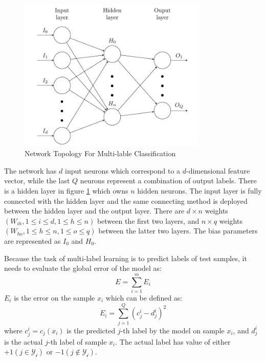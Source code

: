 \graphicspath{ {./Figures/} }
\begin{figure}[!htb]
\centering
\includegraphics[width=0.8\textwidth]{MultiLabelNet.jpeg}
\caption{\label{fig:MultiLabelNet}Network Topology For Multi-lable Classification}
\end{figure}

The network has $d$ input neurons which correspond to a $d$-dimensional feature vector, while the last $Q$ neurons represent a combination of output labels. There is a hidden layer in figure \ref{fig:MultiLabelNet} which owns $n$ hidden neurons. The input layer is fully connected with the hidden layer and the same connecting method is deployed between the hidden layer and the output layer. There are $d \times n$ weights $(W_{ih}, 1 \leq i \leq d, 1 \leq h \leq n)$ between the first two layers, and $n \times q$ weights $(W_{ho}, 1 \leq h \leq n , 1 \leq o \leq q)$ between the latter two layers. The bias parameters are represented as $I_{0}$ and  $H_{0}$.

Because the task of multi-label learning is to predict labels of test samples, it needs to evaluate the global error of the model as:
\begin{equation}\label{eq:MultiLableError}
E = \sum_{i=1}^m E_{i}
\end{equation}
$E_{i}$ is the error on the sample $x_{i}$ which can be defined as:
\begin{equation}\label{eq:MultiLableSamError}
E_{i} = \sum_{j=1}^Q (c_{j}^i - d_{j}^i)^2
\end{equation}
where $c_{j}^i = c_{j}(x_{i})$ is the predicted $j$-th label by the model on sample $x_{i}$, and $d_{j}^i$ is the actual $j$-th label of sample $x_{i}$. The actual label has value of either $+1 (j \in \mathcal{Y_{i}})$ or $-1 (j \notin \mathcal{Y_{i}})$.

